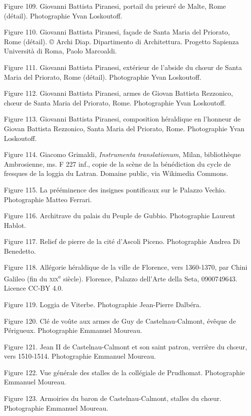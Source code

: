 \documentclass[12pt,twoside,openany]{book}
\begin{document}
Figure 109. Giovanni Battista Piranesi, portail du prieuré de Malte, Rome (détail). Photographie Yvan Loskoutoff.

Figure 110. Giovanni Battista Piranesi, façade de Santa Maria del Priorato, Rome (détail). © Archi Diap. Dipartimento di Architettura. Progetto Sapienza Università di Roma, Paolo Marcoaldi.

Figure 111. Giovanni Battista Piranesi, extérieur de l’abside du chœur de Santa Maria del Priorato, Rome (détail). Photographie Yvan Loskoutoff.

Figure 112. Giovanni Battista Piranesi, armes de Giovan Battista Rezzonico, chœur de Santa Maria del Priorato, Rome. Photographie Yvan Loskoutoff.

Figure 113. Giovanni Battista Piranesi, composition héraldique en l’honneur de Giovan Battista Rezzonico, Santa Maria del Priorato, Rome. Photographie Yvan Loskoutoff.

Figure 114. Giacomo Grimaldi, \textit{Instrumenta translationum}, Milan, bibliothèque Ambrosienne, ms. F 227 inf., copie de la scène de la bénédiction du cycle de fresques de la loggia du Latran. Domaine public, via Wikimedia Commons.

Figure 115. La prééminence des insignes pontificaux sur le Palazzo Vechio. Photographie Matteo Ferrari.

Figure 116. Architrave du palais du Peuple de Gubbio. Photographie Laurent Hablot.

Figure 117. Relief de pierre de la cité d’Ascoli Piceno. Photographie Andrea Di Benedetto.

Figure 118. Allégorie héraldique de la ville de Florence, vers 1360-1370, par Chini Galileo (fin du \textsc{xix}\textsuperscript{e} siècle). Florence, Palazzo dell’Arte della Seta, 0900749643. Licence CC-BY 4.0.

Figure 119. Loggia de Viterbe. Photographie Jean-Pierre Dalbéra.

Figure 120. Clé de voûte aux armes de Guy de Castelnau-Calmont, évêque de Périgueux. Photographie Emmanuel Moureau.

Figure 121. Jean II de Castelnau-Calmont et son saint patron, verrière du chœur, vers 1510-1514. Photographie Emmanuel Moureau.

Figure 122. Vue générale des stalles de la collégiale de Prudhomat. Photographie Emmanuel Moureau.

Figure 123. Armoiries du baron de Castelnau-Calmont, stalles du chœur. Photographie Emmanuel Moureau.
\end{document}
